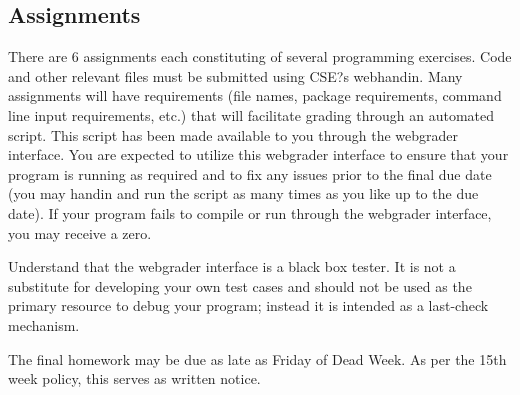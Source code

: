 \documentclass[12pt]{scrartcl}
\begin{document}
%

\subsection{Assignments}

There are 6 assignments each constituting of several programming
exercises.  Code and other relevant files must be submitted using 
CSE?s webhandin.  Many assignments will have requirements (file 
names, package requirements, command line input requirements, 
etc.) that will facilitate grading through an automated script.  
This script has been made available to you through the webgrader 
interface.  You are expected to utilize this webgrader interface 
to ensure that your program is running as required and to fix any 
issues prior to the final due date (you may handin and run the 
script as many times as you like up to the due date).  If your 
program fails to compile or run through the webgrader interface, 
you may receive a zero.

Understand that the webgrader interface is a black box tester.  
It is not a substitute for developing your own test cases and 
should not be used as the primary resource to debug your program; 
instead it is intended as a last-check mechanism.

The final homework may be due as late as Friday of Dead Week.  
As per the 15th week policy, this serves as written notice.
\end{document}
